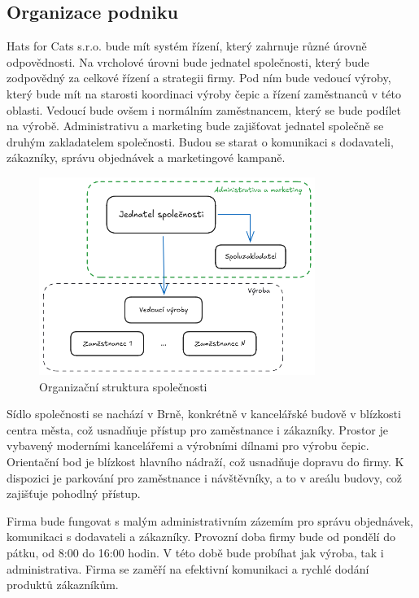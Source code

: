 \documentclass[12pt, a4paper]{article}
\begin{document}
\pagebreak

\subsection{Organizace podniku}

Hats for Cats s.r.o. bude mít systém řízení, který zahrnuje různé úrovně odpovědnosti.
Na vrcholové úrovni bude jednatel společnosti, který bude zodpovědný za celkové řízení a strategii firmy.
Pod ním bude vedoucí výroby, který bude mít na starosti koordinaci výroby čepic a řízení zaměstnanců v této oblasti.
Vedoucí bude ovšem i normálním zaměstnancem, který se bude podílet na výrobě.
Administrativu a marketing bude zajišťovat jednatel společně se druhým zakladatelem společnosti.
Budou se starat o komunikaci s dodavateli, zákazníky, správu objednávek a marketingové kampaně.

\vspace{10pt}

\begin{figure}[h]
  \centering
  \includegraphics[width=0.8\textwidth]{files/obr1.png}
  \caption{Organizační struktura společnosti}
\end{figure}

Sídlo společnosti se nachází v Brně, konkrétně v kancelářské budově v blízkosti centra města, což usnadňuje přístup pro zaměstnance i zákazníky.
Prostor je vybavený moderními kancelářemi a výrobními dílnami pro výrobu čepic.
Orientační bod je blízkost hlavního nádraží, což usnadňuje dopravu do firmy.
K dispozici je parkování pro zaměstnance i návštěvníky, a to v areálu budovy, což zajišťuje pohodlný přístup.
\vspace{10pt}

Firma bude fungovat s malým administrativním zázemím pro správu objednávek, komunikaci s dodavateli a zákazníky.
Provozní doba firmy bude od pondělí do pátku, od 8:00 do 16:00 hodin.
V této době bude probíhat jak výroba, tak i administrativa.
Firma se zaměří na efektivní komunikaci a rychlé dodání produktů zákazníkům.
\end{document}
